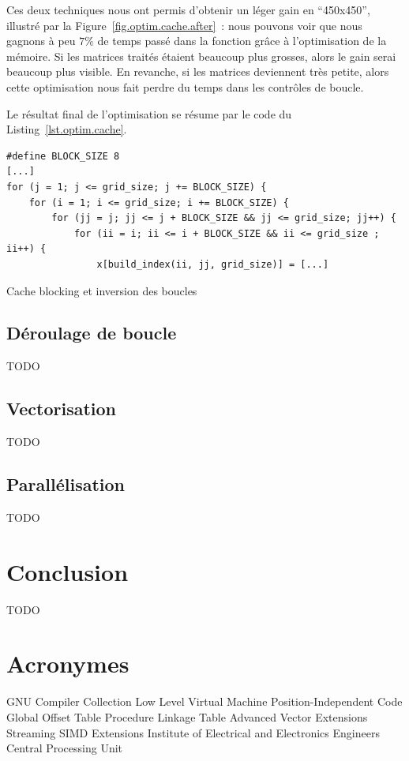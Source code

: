 \documentclass[12pt,a4paper]{article}
\begin{document}
Ces deux techniques nous ont permis d’obtenir un léger gain en
\enquote{450x450}, illustré par la Figure~\ref{fig.optim.cache.after} : nous
pouvons voir que nous gagnons à peu $7\%$ de temps passé dans la fonction grâce
à l’optimisation de la mémoire. Si les matrices traités étaient beaucoup plus
grosses, alors le gain serai beaucoup plus visible. En revanche, si les matrices
deviennent très petite, alors cette optimisation nous fait perdre du temps dans
les contrôles de boucle.

Le résultat final de l’optimisation se résume par le code du Listing~\ref{lst.optim.cache}.
\begin{listing}[h]
    \begin{verbatim}
#define BLOCK_SIZE 8
[...]
for (j = 1; j <= grid_size; j += BLOCK_SIZE) {
    for (i = 1; i <= grid_size; i += BLOCK_SIZE) {
        for (jj = j; jj <= j + BLOCK_SIZE && jj <= grid_size; jj++) {
            for (ii = i; ii <= i + BLOCK_SIZE && ii <= grid_size ; ii++) {
                x[build_index(ii, jj, grid_size)] = [...]
    \end{verbatim}
    \caption{Cache blocking et inversion des boucles}
    \label{lst.optim.cache}
\end{listing}

\subsection{Déroulage de boucle}
\label{sub.optim.unrol}

TODO

\subsection{Vectorisation}
\label{sub.optim.vec}

TODO

\subsection{Parallélisation}
\label{sub.optim.parall}

TODO

\section{Conclusion}
\label{sec.conc}

TODO

\newpage
\section*{Acronymes}
\label{sec.acro}

\begin{acronym}
      {GNU Compiler Collection}
     {Low Level Virtual Machine}
      {Position-Independent Code}
      {Global Offset Table}
      {Procedure Linkage Table}
      {Advanced Vector Extensions}
      {Streaming SIMD Extensions}
     {Institute of Electrical and Electronics Engineers}
      {Central Processing Unit}
\end{acronym}
\end{document}
